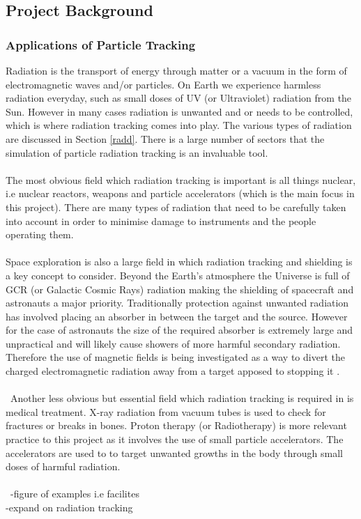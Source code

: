 \documentclass[12pt,a4paper]{article}
\begin{document}
\subsection{Project Background}
\subsubsection{Applications of Particle Tracking}
\label{back}
Radiation is the transport of energy through matter or a vacuum in the form of electromagnetic waves and/or particles. On Earth we experience harmless radiation everyday, such as small doses of UV (or Ultraviolet) radiation from the Sun. However in many cases radiation is unwanted and or needs to be controlled, which is where radiation tracking comes into play. The various types of radiation are discussed in Section \ref{radd}. There is a large number of sectors that the simulation of particle radiation tracking is an invaluable tool.
\\\\
\noindent The most obvious field which radiation tracking is important is all things nuclear, i.e nuclear reactors, weapons and particle accelerators (which is the main focus in this project). There are many types of radiation that need to be carefully taken into account in order to minimise damage to instruments and the people operating them.
\\\\
\noindent Space exploration is also a large field in which radiation tracking and shielding is a key concept to consider. Beyond the Earth's atmosphere the Universe is full of GCR (or Galactic Cosmic Rays) radiation making the shielding of spacecraft and astronauts a major priority. Traditionally protection against unwanted radiation has involved placing an absorber in between the target and the source. However for the case of astronauts the size of the required absorber is extremely large and unpractical and will likely cause showers of more harmful secondary radiation. Therefore the use of magnetic fields is being investigated as a way to divert the charged electromagnetic radiation away from a target apposed to stopping it \cite{magf}. 
\\\\\
\noindent Another less obvious but essential field which radiation tracking is required in is medical treatment. X-ray radiation from vacuum tubes is used to check for fractures or breaks in bones. Proton therapy (or Radiotherapy) is more relevant practice to this project as it involves the use of small particle accelerators. The accelerators are used to to target unwanted growths in the body through small doses of harmful radiation. 
\\\\\
-figure of examples i.e facilites\\
-expand on radiation tracking\\
\end{document}
